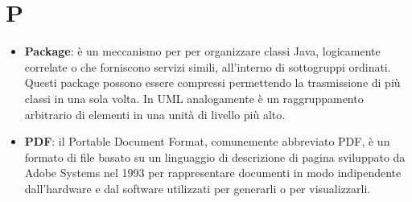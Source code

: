 \section{P}
\begin{itemize} 
	\item
	\textbf{Package}: è un meccanismo per per organizzare classi Java, logicamente correlate o che forniscono servizi simili, all’interno di sottogruppi ordinati. Questi package possono essere compressi permettendo la trasmissione di più classi in una sola volta.
	In UML analogamente è un raggruppamento arbitrario di elementi in una unità di livello più alto.
	\item
	\textbf{PDF}: il Portable Document Format, comunemente abbreviato PDF, è un formato di file basato su un linguaggio di descrizione di pagina sviluppato da Adobe Systems nel 1993 per rappresentare documenti in modo indipendente dall’hardware e dal software utilizzati per generarli o per visualizzarli.
\end{itemize}

